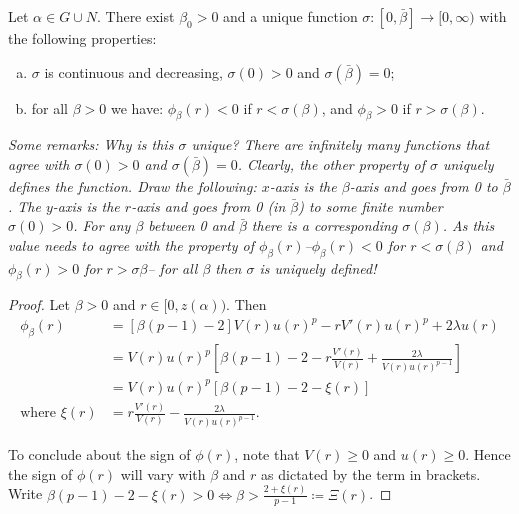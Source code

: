 
\newpage
\begin{lemma}
	Let $\alpha\in G\cup N$.
	There exist $\beta_0>0$ and a unique function
	$\sigma:[0,\bar\beta]\to[0,\infty)$ with the following properties:
	\begin{enumerate}[(a)]
		\item  $\sigma$ is continuous and decreasing,
		$\sigma(0)>0$ and $\sigma(\bar\beta)=0$;
    \item for all $\beta>0$ we have: $\phi_\beta(r)<0$ if $r<\sigma(\beta)$,
		and $\phi_\beta>0$ if $r>\sigma(\beta)$.
	\end{enumerate}

	\seperate

	\emph{Some remarks: Why is this $\sigma$ unique? There are infinitely many functions that agree with $\sigma(0)>0$ and $\sigma(\bar{\beta})=0$. Clearly, the other property of $\sigma$ uniquely defines the function. Draw the following: $x$-axis is the $\beta$-axis and goes from 0 to $\bar{\beta}$. The $y$-axis is the $r$-axis and goes from 0 (in $\bar{\beta}$) to some finite number $\sigma(0)>0$. For any $\beta$ between 0 and $\bar{\beta}$ there is a corresponding $\sigma(\beta)$. As this value needs to agree with the property of $\phi_{\beta}(r)$--$\phi_{\beta}(r)<0$ for $r<\sigma(\beta)$ and $\phi_{\beta}(r)>0$ for $r>\sigma{\beta}$-- for all $\beta$ then $\sigma$ is uniquely defined!}\\[11pt]


\begin{proof}
Let $\beta>0$ and $r\in[0,z(\alpha))$.
Then \begin{align*}
	\phi_{\beta}(r)&=\left[\beta(p-1)-2\right]V(r)u(r)^p-rV'(r)u(r)^p+2\lambda u(r) %
\\ &=V(r)u(r)^p\left[\beta(p-1)-2-r\frac{V'(r)}{V(r)}+\frac{2\lambda}{V(r)u(r)^{p-1}}\right]
\\ &= V(r)u(r)^p\left[\beta(p-1)-2-\xi(r)\right]
\\\text{where }\xi(r)&=r\frac{V'(r)}{V(r)}-\frac{2\lambda}{V(r)u(r)^{p-1}}.
\end{align*}

\seperate

To conclude about the sign of $\phi(r)$, note that $V(r)\geq0$ and $u(r)\geq0$.
Hence the sign of $\phi(r)$ will vary with $\beta$ and $r$ as dictated by the term in brackets.
Write $\beta(p-1)-2-\xi(r)>0\iff\beta>\frac{2+\xi(r)}{p-1}\coloneqq\Xi(r)$.


\end{proof}
\end{lemma}
